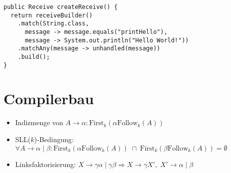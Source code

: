 \documentclass[11pt]{scrartcl}
\begin{document}
\noindent
\texttt{public Receive createReceive() \{} \\
\mbox{\texttt{~~return receiveBuilder()}} \\
\mbox{\texttt{~~~~.match(String.class,}} \\
\mbox{\texttt{~~~~~~message -> message.equals("printHello"),}} \\
\mbox{\texttt{~~~~~~message -> System.out.println("Hello World!"))}} \\
\mbox{\texttt{~~~~.matchAny(message -> unhandled(message))}} \\
\mbox{\texttt{~~~~.build();}} \\
\mbox{\texttt{\}}} \\

\section{Compilerbau}

\begin{itemize}
    \item Indizmenge von \( A \rightarrow \alpha : \textrm{First}_k ( \alpha \textrm{Follow}_k ( A ) ) \) 
    \item SLL(\( k \))-Bedingung: \( \forall A \rightarrow \alpha \; | \; \beta : 
    \textrm{First}_k ( \alpha \textrm{Follow}_k ( A ) ) \; \cap \;
    \textrm{First}_k ( \beta \textrm{Follow}_k ( A ) ) = \emptyset \)
    \item Linksfaktorisierung: \( X \rightarrow \gamma \alpha \; | \; \gamma \beta \Rightarrow X \rightarrow \gamma X', \; X' \rightarrow \alpha \; | \; \beta \)
\end{itemize}
\end{document}
